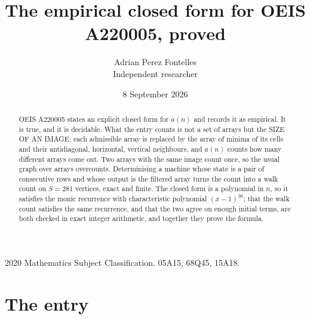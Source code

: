 \documentclass[11pt,a4paper]{article}
\title{The empirical closed form for OEIS A220005, proved}
\author{Adrian Perez Fontelles\\ \small Independent researcher}
\date{8 September 2026}
\theoremstyle{plain}
\theoremstyle{definition}
\begin{document}
\maketitle

\begin{abstract}
OEIS A220005 states an explicit closed form for $a(n)$ and records it as empirical. It is true, and
it is decidable. What the entry counts is not a set of arrays but the SIZE OF AN IMAGE: each
admissible array is replaced by the array of minima of its cells and their antidiagonal, horizontal, vertical neighbours,
and $a(n)$ counts how many different arrays come out. Two arrays with the same image count
once, so the usual graph over arrays overcounts. Determinising a machine whose state is a pair
of consecutive rows and whose output is the filtered array turns the count into a walk count on
$S=281$ vertices, exact and finite. The closed form is a polynomial in $n$, so it satisfies the
monic recurrence with characteristic polynomial $(x-1)^{30}$; that the walk count
satisfies the same recurrence, and that the two agree on enough initial terms, are both checked
in exact integer arithmetic, and together they prove the formula.
\end{abstract}

\noindent\small 2020 Mathematics Subject Classification. 05A15, 68Q45, 15A18.\normalsize

\section{The entry}
\end{document}
